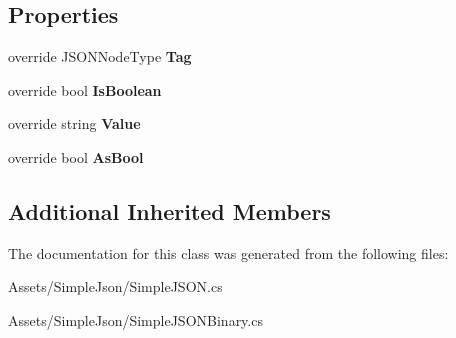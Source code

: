 \subsection*{Properties}
\begin{DoxyCompactItemize}
\item 
override J\+S\+O\+N\+Node\+Type {\bfseries Tag}\hypertarget{classSimpleJSON_1_1JSONBool_a57dc9f136af0233b43ba3c9658171b18}{}\label{classSimpleJSON_1_1JSONBool_a57dc9f136af0233b43ba3c9658171b18}

\item 
override bool {\bfseries Is\+Boolean}\hypertarget{classSimpleJSON_1_1JSONBool_affadfd5bba7f1118afac492cc6699982}{}\label{classSimpleJSON_1_1JSONBool_affadfd5bba7f1118afac492cc6699982}

\item 
override string {\bfseries Value}\hypertarget{classSimpleJSON_1_1JSONBool_af9de7d35573467f69af96cf657acf46d}{}\label{classSimpleJSON_1_1JSONBool_af9de7d35573467f69af96cf657acf46d}

\item 
override bool {\bfseries As\+Bool}\hypertarget{classSimpleJSON_1_1JSONBool_a30367e2048a00e800a9b47f9998f2b4b}{}\label{classSimpleJSON_1_1JSONBool_a30367e2048a00e800a9b47f9998f2b4b}

\end{DoxyCompactItemize}
\subsection*{Additional Inherited Members}


The documentation for this class was generated from the following files\+:\begin{DoxyCompactItemize}
\item 
Assets/\+Simple\+Json/Simple\+J\+S\+O\+N.\+cs\item 
Assets/\+Simple\+Json/Simple\+J\+S\+O\+N\+Binary.\+cs\end{DoxyCompactItemize}
